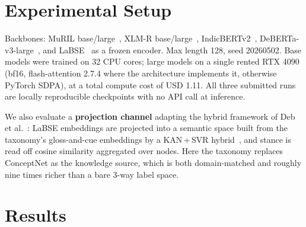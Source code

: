 \documentclass[twocolumn]{ceurart}
\begin{document}
\section{Experimental Setup}

Backbones: MuRIL base/large~\cite{khanuja2021}, XLM-R base/large~\cite{conneau2020},
IndicBERTv2~\cite{doddapaneni2023}, DeBERTa-v3-large~\cite{he2021}, and LaBSE~\cite{feng2022}
as a frozen encoder. Max length 128, seed 20260502. Base models were trained on
32 CPU cores; large models on a single rented RTX 4090 (bf16, flash-attention
2.7.4 where the architecture implements it, otherwise PyTorch SDPA), at a total
compute cost of USD 1.11. All three submitted runs are locally reproducible
checkpoints with no API call at inference.

We also evaluate a \textbf{projection channel} adapting the hybrid framework of
Deb et al.~\cite{deb2026}: LaBSE embeddings are projected into a semantic space
built from the taxonomy's gloss-and-cue embeddings by a KAN\,+\,SVR
hybrid~\cite{liu2024}, and stance is read off cosine similarity aggregated over
nodes. Here the taxonomy replaces ConceptNet as the knowledge source, which is
both domain-matched and roughly nine times richer than a bare 3-way label space.

\section{Results}
\label{sec:results}
\end{document}
